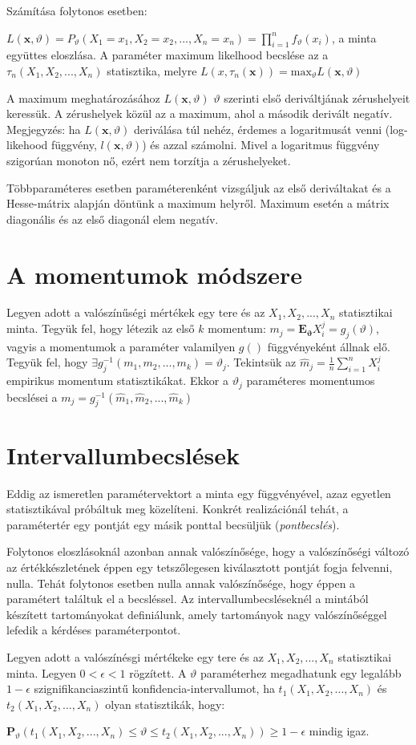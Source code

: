 Számítása folytonos esetben:

$
L(\mathbf{x}, \vartheta) = P_\vartheta(X_1=x_1, X_2 = x_2, ..., X_n=x_n) = \prod_{i=1}^nf_\vartheta(x_i)$, a minta együttes eloszlása. A paraméter maximum likelhood becslése az a $\tau_n(X_1,X_2, ..., X_n)$ statisztika, melyre $L(x, \tau_n(\mathbf{x})) = \text{max}_\vartheta L(\mathbf{x}, \vartheta)
$

A maximum meghatározásához $L(\mathbf{x}, \vartheta)$ $\vartheta$ szerinti első deriváltjának zérushelyeit keressük. A zérushelyek közül az a maximum, ahol a második derivált negatív. Megjegyzés: ha $L(\mathbf{x}, \vartheta)$ deriválása túl nehéz, érdemes a logaritmusát venni (log-likehood függvény, $l(\mathbf{x}, \vartheta)$) és azzal számolni. Mivel a logaritmus függvény szigorúan monoton nő, ezért nem torzítja a zérushelyeket.

Többparaméteres esetben paraméterenként vizsgáljuk az első deriváltakat és a Hesse-mátrix alapján döntünk a maximum helyről. Maximum esetén a mátrix diagonális és az első diagonál elem negatív.

\section{A momentumok módszere}

Legyen adott a valószínűségi mértékek egy tere és az $X_1, X_2, ..., X_n$ statisztikai minta. Tegyük fel, hogy létezik az első $k$ momentum: $m_j = \mathbf{E}_\mathbf{\vartheta}X_i^j = g_j(\vartheta)$, vagyis a momentumok a paraméter valamilyen $g()$ függvényeként állnak elő. Tegyük fel, hogy $\exists g_j^{-1}(m_1, m_2, ..., m_k) = \vartheta_j$. Tekintsük az $\hat{m}_j=\frac{1}{n}\sum_{i=1}^nX_i^j$ empirikus momentum statisztikákat. Ekkor  a $\vartheta_j$ paraméteres momentumos becslései a $m_j = g_j^{-1}(\hat{m}_1, \hat{m}_2, ...,\hat{m}_k)$

\section{Intervallumbecslések}

Eddig az ismeretlen paramétervektort a minta egy függvényével, azaz egyetlen statisztikával próbáltuk meg közelíteni. Konkrét realizációnál tehát, a paramétertér egy pontját egy másik ponttal becsüljük (\emph{pontbecslés}).

Folytonos eloszlásoknál azonban annak valószínősége, hogy a valószínőségi változó az értékkészletének éppen egy tetszőlegesen kiválasztott pontját fogja felvenni, nulla. Tehát folytonos esetben nulla annak valószínősége, hogy éppen a paramétert találtuk el a becsléssel. Az intervallumbecsléseknél a mintából készített tartományokat definiálunk, amely tartományok nagy valószínőséggel lefedik a kérdéses paraméterpontot.

Legyen adott a valószínésgi mértékeke egy tere és az $X_1, X_2, ..., X_n$ statisztikai minta. Legyen $0<\epsilon<1$ rögzített. A $\vartheta$ paraméterhez megadhatunk egy legalább $1-\epsilon$ szignifikanciaszintű konfidencia-intervallumot, ha $t_1(X_1, X_2, ..., X_n)$ és $t_2(X_1, X_2, ..., X_n)$ olyan statisztikák, hogy:

$\mathbf{P}_\vartheta(t_1(X_1, X_2, ..., X_n) \leq \vartheta \leq t_2(X_1, X_2, ..., X_n)) \geq 1-\epsilon$ mindig igaz.